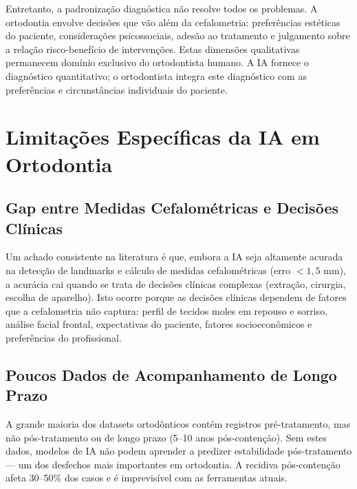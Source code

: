 Entretanto, a padronização diagnóstica não resolve todos os problemas. A ortodontia envolve decisões que vão além da cefalometria: preferências estéticas do paciente, considerações psicossociais, adesão ao tratamento e julgamento sobre a relação risco-benefício de intervenções. Estas dimensões qualitativas permanecem domínio exclusivo do ortodontista humano. A IA fornece o diagnóstico quantitativo; o ortodontista integra este diagnóstico com as preferências e circunstâncias individuais do paciente.

\section{Limitações Específicas da IA em Ortodontia}

\subsection{Gap entre Medidas Cefalométricas e Decisões Clínicas}

Um achado consistente na literatura é que, embora a IA seja altamente acurada na detecção de landmarks e cálculo de medidas cefalométricas (erro $<1,5$ mm), a acurácia cai quando se trata de decisões clínicas complexas (extração, cirurgia, escolha de aparelho). Isto ocorre porque as decisões clínicas dependem de fatores que a cefalometria não captura: perfil de tecidos moles em repouso e sorriso, análise facial frontal, expectativas do paciente, fatores socioeconômicos e preferências do profissional.

\subsection{Poucos Dados de Acompanhamento de Longo Prazo}

A grande maioria dos datasets ortodônticos contém registros pré-tratamento, mas não pós-tratamento ou de longo prazo (5--10 anos pós-contenção). Sem estes dados, modelos de IA não podem aprender a predizer estabilidade pós-tratamento --- um dos desfechos mais importantes em ortodontia. A recidiva pós-contenção afeta 30--50\% dos casos e é imprevisível com as ferramentas atuais.



